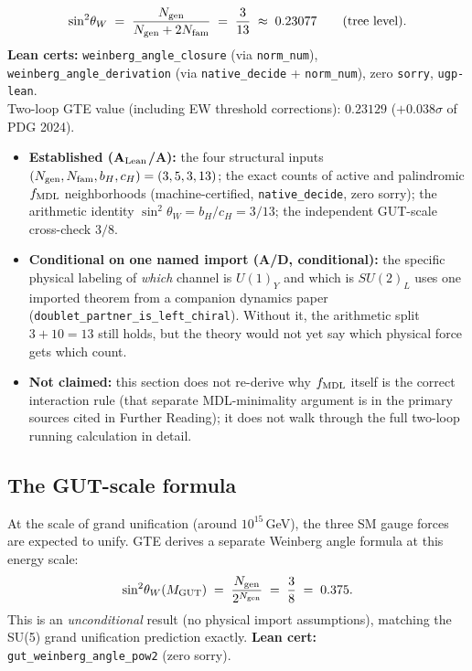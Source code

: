 \documentclass[11pt,a4paper]{article}
\newcommand{\sinwsq}{\sin^2\!\theta_W}
\newcommand{\Ngen}{N_{\rm gen}}
\newcommand{\Nfam}{N_{\rm fam}}
\newcommand{\cH}{c_H}
\newcommand{\lean}[1]{\texttt{#1}}
\begin{document}
\medskip
\begin{tcolorbox}[colback=boxgreen,colframe=green!50!black,
  title=GTE Result: Weinberg Angle (machine-certified)]
\[
  \sinwsq \;=\; \frac{\Ngen}{\Ngen + 2\Nfam}
  \;=\; \frac{3}{13} \;\approx\; 0.23077
  \qquad (\text{tree level}).
\]
\textbf{Lean certs:} \lean{weinberg\_angle\_closure} (via \lean{norm\_num}),
\lean{weinberg\_angle\_derivation} (via \lean{native\_decide} + \lean{norm\_num}),
zero \texttt{sorry}, \texttt{ugp-lean}.\\[4pt]
Two-loop GTE value (including EW threshold corrections): $0.23129$ ($+0.038\sigma$ of PDG 2024).
\end{tcolorbox}

\begin{tcolorbox}[colback=boxred,colframe=red!50!black,title=Certification status --- what this derivation does and does not claim]
\begin{itemize}[itemsep=3pt]
  \item \textbf{Established ($\mathbf{A}_{\rm Lean}$/A):} the four structural
    inputs $(\Ngen,\Nfam,b_H,\cH)=(3,5,3,13)$; the exact counts of active and
    palindromic $f_{\rm MDL}$ neighborhoods (machine-certified,
    \lean{native\_decide}, zero sorry); the arithmetic identity
    $\sinwsq=b_H/\cH=3/13$; the independent GUT-scale cross-check $3/8$.
  \item \textbf{Conditional on one named import (A/D, conditional):} the
    specific physical labeling of \emph{which} channel is $U(1)_Y$ and which
    is $SU(2)_L$ uses one imported theorem from a companion dynamics paper
    (\lean{doublet\_partner\_is\_left\_chiral}).  Without it, the arithmetic
    split $3+10=13$ still holds, but the theory would not yet say which
    physical force gets which count.
  \item \textbf{Not claimed:} this section does not re-derive why $f_{\rm MDL}$
    itself is the correct interaction rule (that separate MDL-minimality
    argument is in the primary sources cited in Further Reading); it does not
    walk through the full two-loop running calculation in detail.
\end{itemize}
\end{tcolorbox}

\subsection{The GUT-scale formula}

At the scale of grand unification (around $10^{15}$\,GeV), the three SM gauge
forces are expected to unify.  GTE derives a separate Weinberg angle formula
at this energy scale:
\[
  \sinwsq(M_{\rm GUT}) \;=\; \frac{\Ngen}{2^{\Ngen}} \;=\; \frac{3}{8} \;=\; 0.375.
\]
This is an \emph{unconditional} result (no physical import assumptions), matching
the SU(5) grand unification prediction exactly.
\textbf{Lean cert:} \lean{gut\_weinberg\_angle\_pow2} (zero sorry).
\end{document}
